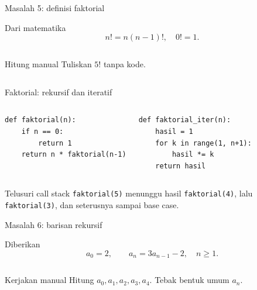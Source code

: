 \documentclass[aspectratio=169,11pt]{beamer}
\begin{document}
\begin{frame}{Masalah 5: definisi faktorial}
\begin{block}{Dari matematika}
\[
n! = n(n-1)!, \quad 0!=1.
\]
\end{block}
\begin{columns}[T]
\begin{block}{Hitung manual}
Tuliskan $5!$ tanpa kode.
\end{block}
\end{columns}
\end{frame}

\begin{frame}[fragile]{Faktorial: rekursif dan iteratif}
\begin{columns}[T]
\begin{lstlisting}
def faktorial(n):
    if n == 0:
        return 1
    return n * faktorial(n-1)
\end{lstlisting}
\begin{lstlisting}
def faktorial_iter(n):
    hasil = 1
    for k in range(1, n+1):
        hasil *= k
    return hasil
\end{lstlisting}
\end{columns}
\pause
\begin{block}{Telusuri call stack}
\texttt{faktorial(5)} menunggu hasil \texttt{faktorial(4)}, lalu \texttt{faktorial(3)}, dan seterusnya sampai base case.
\end{block}
\end{frame}

\begin{frame}{Masalah 6: barisan rekursif}
\begin{block}{Diberikan}
\[
a_0=2,\qquad a_n=3a_{n-1}-2,\quad n\ge 1.
\]
\end{block}
\begin{columns}[T]
\begin{block}{Kerjakan manual}
Hitung $a_0,a_1,a_2,a_3,a_4$. Tebak bentuk umum $a_n$.
\end{block}
\end{columns}
\end{frame}
\end{document}
